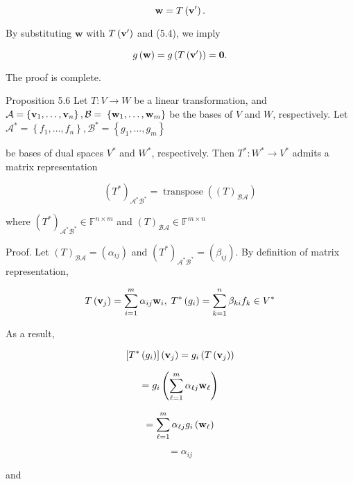 \documentclass[11pt]{article}
\begin{document}
\[
\mathbf{w} = T\left( {\bf v}^{\prime }\right) .
\]

By substituting \(\mathbf{w}\) with \(T\left( {\bf v}^{\prime }\right)\) and (5.4), we imply

\[
g\left( \mathbf{w}\right)  = g\left( {T\left( {\bf v}^{\prime }\right) }\right)  = \mathbf{0}.
\]

The proof is complete.

Proposition 5.6 Let \(T : V \rightarrow  W\) be a linear transformation, and \(\mathcal{A} = \left\{  {{\bf v}_1,\ldots ,{\bf v}_n}\right\}  ,\mathcal{B} =\)  \(\left\{  {{\bf w}_1,\ldots ,{\bf w}_{m}}\right\}\) be the bases of \(V\) and \(W\), respectively. Let \({\mathcal{A}}^{ * } = \left\{  {{f}_1,\ldots ,{f}_n}\right\}  ,{\mathcal{B}}^{ * } = \left\{  {{g}_1,\ldots ,{g}_{m}}\right\}\)

be bases of dual spaces \({V}^{ * }\) and \({W}^{ * }\), respectively. Then \({T}^{ * } : {W}^{ * } \rightarrow  {V}^{ * }\) admits a matrix representation

\[
{\left( {T}^{ * }\right) }_{{\mathcal{A}}^{ * }{\mathcal{B}}^{ * }} = \operatorname{transpose}\left( {\left( T\right) }_{\mathcal{B}\mathcal{A}}\right)
\]

where \({\left( {T}^{ * }\right) }_{{\mathcal{A}}^{ * }{\mathcal{B}}^{ * }} \in  {\mathbb{F}}^{n \times  m}\) and \({\left( T\right) }_{\mathcal{B}\mathcal{A}} \in  {\mathbb{F}}^{m \times  n}\)

Proof. Let \({\left( T\right) }_{\mathcal{{BA}}} = \left( \alpha_{ij}\right)\) and \({\left( {T}^{ * }\right) }_{{\mathcal{A}}^{ * }{\mathcal{B}}^{ * }} = \left( \beta_{ij}\right)\). By definition of matrix representation,

\[
T\left( {\bf v}_{j}\right)  = \mathop{\sum }\limits_{{i = 1}}^{m}\alpha_{ij}{\bf w}_{i},\;{T}^{ * }\left( {g}_{i}\right)  = \mathop{\sum }\limits_{{k = 1}}^n\beta_{ki}{f}_{k} \in  {V}^{ * }
\]

As a result,

\[
\left\lbrack  {{T}^{ * }\left( {g}_{i}\right) }\right\rbrack  \left( {\bf v}_{j}\right)  = {g}_{i}\left( {T\left( {\bf v}_{j}\right) }\right)
\]

\[
= {g}_{i}\left( {\mathop{\sum }\limits_{{\ell  = 1}}^{m}\alpha_{\ell j}{\bf w}_{\ell }}\right)
\]

\[
= \mathop{\sum }\limits_{{\ell  = 1}}^{m}\alpha_{\ell j}{g}_{i}\left( {\bf w}_{\ell }\right)
\]

\[
= \alpha_{ij}
\]

and
\end{document}
